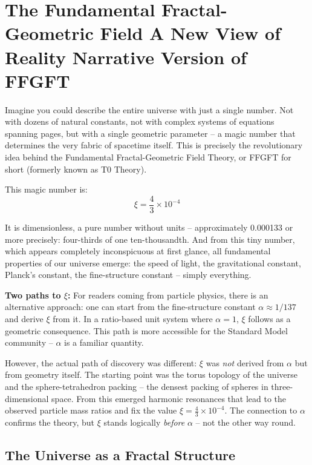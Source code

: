 \chapter{The Fundamental Fractal-Geometric Field  A New View of Reality  Narrative Version of FFGFT}



Imagine you could describe the entire universe with just a single number. Not with dozens of natural constants, not with complex systems of equations spanning pages, but with a single geometric parameter -- a magic number that determines the very fabric of spacetime itself. This is precisely the revolutionary idea behind the Fundamental Fractal-Geometric Field Theory, or FFGFT for short (formerly known as T0 Theory).

This magic number is:
\begin{equation}
\xi = \frac{4}{3} \times 10^{-4}
\end{equation}

It is dimensionless, a pure number without units -- approximately 0.000133 or more precisely: four-thirds of one ten-thousandth. And from this tiny number, which appears completely inconspicuous at first glance, all fundamental properties of our universe emerge: the speed of light, the gravitational constant, Planck's constant, the fine-structure constant -- simply everything.

\textbf{Two paths to $\xi$:} For readers coming from particle physics, there is an alternative approach: one can start from the fine-structure constant $\alpha \approx 1/137$ and derive $\xi$ from it. In a ratio-based unit system where $\alpha = 1$, $\xi$ follows as a geometric consequence. This path is more accessible for the Standard Model community -- $\alpha$ is a familiar quantity.

However, the actual path of discovery was different: $\xi$ was \textit{not} derived from $\alpha$ but from geometry itself. The starting point was the torus topology of the universe and the sphere-tetrahedron packing -- the densest packing of spheres in three-dimensional space. From this emerged harmonic resonances that lead to the observed particle mass ratios and fix the value $\xi = \frac{4}{3} \times 10^{-4}$. The connection to $\alpha$ confirms the theory, but $\xi$ stands logically \textit{before} $\alpha$ -- not the other way round.

\section{The Universe as a Fractal Structure}

